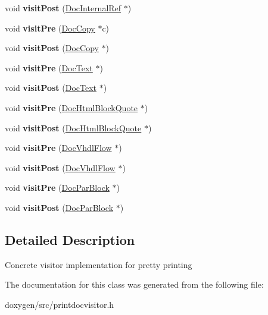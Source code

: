 \begin{DoxyCompactItemize}
void {\bfseries visit\+Post} (\mbox{\hyperlink{class_doc_internal_ref}{Doc\+Internal\+Ref}} $\ast$)
\item 
\mbox{\label{class_print_doc_visitor_ae3faa9a7e63dd8f015448b56459a95aa}} 
void {\bfseries visit\+Pre} (\mbox{\hyperlink{class_doc_copy}{Doc\+Copy}} $\ast$c)
\item 
\mbox{\label{class_print_doc_visitor_a9fbb832766bc65d15417315824e71613}} 
void {\bfseries visit\+Post} (\mbox{\hyperlink{class_doc_copy}{Doc\+Copy}} $\ast$)
\item 
\mbox{\label{class_print_doc_visitor_ad761f1a772c4cd2ba8b31f25c9108a4d}} 
void {\bfseries visit\+Pre} (\mbox{\hyperlink{class_doc_text}{Doc\+Text}} $\ast$)
\item 
\mbox{\label{class_print_doc_visitor_aeddf0f93604084255c945d73a1dd4e50}} 
void {\bfseries visit\+Post} (\mbox{\hyperlink{class_doc_text}{Doc\+Text}} $\ast$)
\item 
\mbox{\label{class_print_doc_visitor_aa6a518555cb684bb8e15df5e3ae36ac0}} 
void {\bfseries visit\+Pre} (\mbox{\hyperlink{class_doc_html_block_quote}{Doc\+Html\+Block\+Quote}} $\ast$)
\item 
\mbox{\label{class_print_doc_visitor_a78d0e60b8584755bd6510c77ea5aade1}} 
void {\bfseries visit\+Post} (\mbox{\hyperlink{class_doc_html_block_quote}{Doc\+Html\+Block\+Quote}} $\ast$)
\item 
\mbox{\label{class_print_doc_visitor_a8d26f886caf2155c826c4998750c0dd3}} 
void {\bfseries visit\+Pre} (\mbox{\hyperlink{class_doc_vhdl_flow}{Doc\+Vhdl\+Flow}} $\ast$)
\item 
\mbox{\label{class_print_doc_visitor_a3b8fc5a500ebaf673da5ed6aac299771}} 
void {\bfseries visit\+Post} (\mbox{\hyperlink{class_doc_vhdl_flow}{Doc\+Vhdl\+Flow}} $\ast$)
\item 
\mbox{\label{class_print_doc_visitor_a71e45aa686a436fcad59a429f0e06e8d}} 
void {\bfseries visit\+Pre} (\mbox{\hyperlink{class_doc_par_block}{Doc\+Par\+Block}} $\ast$)
\item 
\mbox{\label{class_print_doc_visitor_a233cee98aaf6c3ea0bef26348bb67397}} 
void {\bfseries visit\+Post} (\mbox{\hyperlink{class_doc_par_block}{Doc\+Par\+Block}} $\ast$)
\end{DoxyCompactItemize}


\subsection{Detailed Description}
Concrete visitor implementation for pretty printing 

The documentation for this class was generated from the following file\+:\begin{DoxyCompactItemize}
\item 
doxygen/src/printdocvisitor.\+h\end{DoxyCompactItemize}
